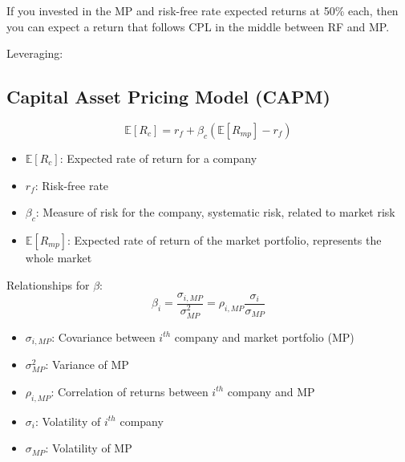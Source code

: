     \begin{example}
        If you invested in the MP and risk-free rate expected returns at 50\% each, then you can expect a return that follows CPL in the middle between RF and MP.
    \end{example}

    \begin{example}
        Leveraging:

    \end{example}

\subsection{Capital Asset Pricing Model (CAPM)}
\begin{definition}
    \begin{equation}
        \mathbb{E}[R_c] = r_f + \beta_c \left(\mathbb{E}[R_{mp}] - r_f\right)
    \end{equation}
        
    \begin{itemize}
        \item $\mathbb{E}[R_c]$: Expected rate of return for a company
        \item $r_f$: Risk-free rate
        \item $\beta_c$: Measure of risk for the company, systematic risk, related to market risk
        \item $\mathbb{E}[R_{mp}]$: Expected rate of return of the market portfolio, represents the whole market
    \end{itemize}

    \vspace{1em}

    Relationships for $\beta$:
    \begin{equation}
        \beta_i = \frac{\sigma_{i, MP}}{\sigma^2_{MP}} = \rho_{i, MP} \frac{\sigma_i}{\sigma_{MP}}
    \end{equation}
    
    \begin{itemize}
        \item $\sigma_{i, MP}$: Covariance between $i^{th}$ company and market portfolio (MP)
        \item $\sigma^2_{MP}$: Variance of MP
        \item $\rho_{i, MP}$: Correlation of returns between $i^{th}$ company and MP
        \item $\sigma_i$: Volatility of $i^{th}$ company
        \item $\sigma_{MP}$: Volatility of MP
    \end{itemize}

\end{definition}

